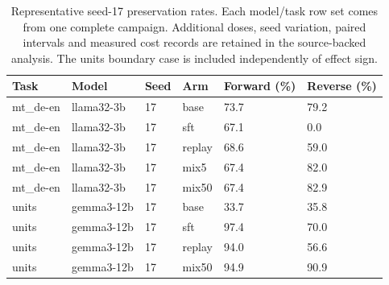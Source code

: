 \begin{table}[t]
\centering\small
\begin{tabular}{llllll}
\toprule
Task & Model & Seed & Arm & Forward (\%) & Reverse (\%) \\
\midrule
mt\_de-en & llama32-3b & 17 & base & 73.7 & 79.2 \\
mt\_de-en & llama32-3b & 17 & sft & 67.1 & 0.0 \\
mt\_de-en & llama32-3b & 17 & replay & 68.6 & 59.0 \\
mt\_de-en & llama32-3b & 17 & mix5 & 67.4 & 82.0 \\
mt\_de-en & llama32-3b & 17 & mix50 & 67.4 & 82.9 \\
units & gemma3-12b & 17 & base & 33.7 & 35.8 \\
units & gemma3-12b & 17 & sft & 97.4 & 70.0 \\
units & gemma3-12b & 17 & replay & 94.0 & 56.6 \\
units & gemma3-12b & 17 & mix50 & 94.9 & 90.9 \\
\bottomrule
\end{tabular}
\caption{Representative seed-17 preservation rates. Each model/task row set comes from one complete campaign. Additional doses, seed variation, paired intervals and measured cost records are retained in the source-backed analysis. The units boundary case is included independently of effect sign.}
\label{tab:preservation-summary}
\end{table}
